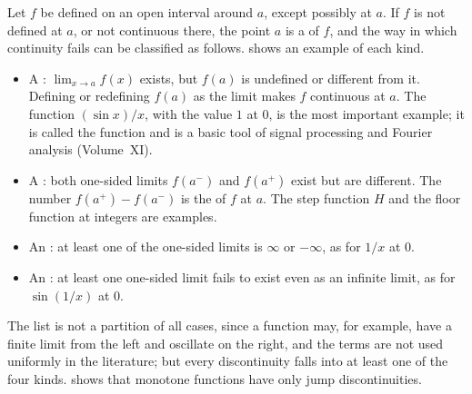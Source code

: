 Let $f$ be defined on an open interval around $a$, except possibly at $a$. If $f$ is not defined at $a$, or not continuous there, the point $a$ is a  of $f$, and the way in which continuity fails can be classified as follows.  shows an example of each kind.
\begin{itemize}
\item A : $\lim_{x\to a}f(x)$ exists, but $f(a)$ is undefined or different from it. Defining or redefining $f(a)$ as the limit makes $f$ continuous at $a$. The function $(\sin x)/x$, with the value $1$ at $0$, is the most important example; it is called the  function and is a basic tool of signal processing and Fourier analysis (Volume~XI).
\item A : both one-sided limits $f(a^-)$ and $f(a^+)$ exist but are different. The number $f(a^+)-f(a^-)$ is the  of $f$ at $a$. The step function $H$ and the floor function at integers are examples.
\item An : at least one of the one-sided limits is $\infty$ or $-\infty$, as for $1/x$ at $0$.
\item An : at least one one-sided limit fails to exist even as an infinite limit, as for $\sin(1/x)$ at $0$.
\end{itemize}
The list is not a partition of all cases, since a function may, for example, have a finite limit from the left and oscillate on the right, and the terms are not used uniformly in the literature; but every discontinuity falls into at least one of the four kinds.  shows that monotone functions have only jump discontinuities.

